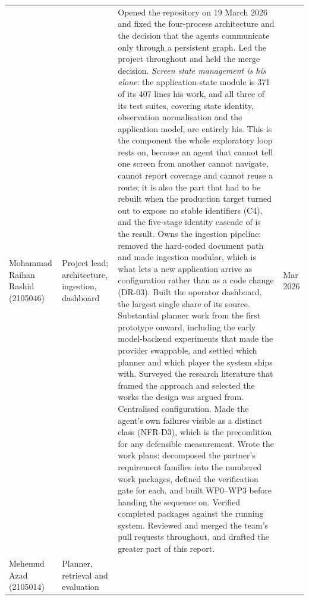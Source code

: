 \begin{xltabular}{\textwidth}{@{}>{\hsize}Y>{\hsize}Y>{\hsize}Y>{\hsize}Y@{}}
  Mohammad Raihan Rashid (2105046) &
    Project lead; architecture, ingestion, dashboard &
    Opened the repository on 19 March 2026 and fixed the four-process architecture and the decision that the agents communicate only through a persistent graph. Led the project throughout and held the merge decision. \emph{Screen state management is his alone}: the application-state module is 371 of its 407 lines his work, and all three of its test suites, covering state identity, observation normalisation and the application model, are entirely his. This is the component the whole exploratory loop rests on, because an agent that cannot tell one screen from another cannot navigate, cannot report coverage and cannot reuse a route; it is also the part that had to be rebuilt when the production target turned out to expose no stable identifiers (C4), and the five-stage identity cascade of  is the result. Owns the ingestion pipeline: removed the hard-coded document path and made ingestion modular, which is what lets a new application arrive as configuration rather than as a code change (DR-03). Built the operator dashboard, the largest single share of its source. Substantial planner work from the first prototype onward, including the early model-backend experiments that made the provider swappable, and settled which planner and which player the system ships with. Surveyed the research literature that framed the approach and selected the works the design was argued from. Centralised configuration. Made the agent's own failures visible as a distinct class (NFR-D3), which is the precondition for any defensible measurement. Wrote the work plans: decomposed the partner's requirement families into the numbered work packages, defined the verification gate for each, and built WP0--WP3 before handing the sequence on. Verified completed packages against the running system. Reviewed and merged the team's pull requests throughout, and drafted the greater part of this report. &
    Mar 2026 \\
  \addlinespace
  Mehemud Azad (2105014) &
    Planner, retrieval and evaluation &

\end{xltabular}
